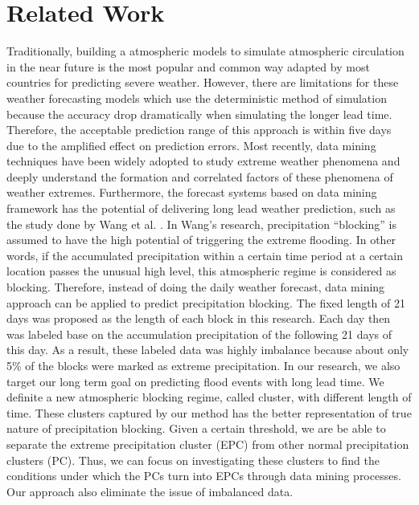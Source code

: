 \documentclass{acm_proc_article-sp}
\begin{document}
\section{Related Work}
\label{sec:relatedwork}
Traditionally, building a atmospheric models to simulate atmospheric circulation in the near future is the most popular and common way adapted by most countries for predicting severe weather.\cite{cloke2009ensemble} However, there are limitations for these weather forecasting models which use the deterministic method of simulation because the accuracy drop dramatically when simulating the longer lead time.\cite{lubchenco2012extreme}
Therefore, the acceptable prediction range of this approach is within five days due to the amplified effect on prediction errors.\cite{alfieri2012operational}
\newline Most recently, data mining techniques have been widely adopted to
study extreme weather phenomena and deeply understand the formation and
correlated factors of these phenomena of weather extremes.
\cite{li2008real} \cite{supinie2009spatiotemporal} \cite{mcgovern2011using}
 \cite{Wang:2013:TLF:2487575.2488220} Furthermore, the forecast systems based on
data mining framework has the potential of delivering long lead weather
prediction, such as the study done by Wang et al.
\cite{Wang:2013:TLF:2487575.2488220}. In Wang's research, precipitation
``blocking'' is assumed to have the high
potential of triggering the extreme flooding. In other words, if
the accumulated precipitation within a certain time period at a certain location
passes the unusual high level, this atmospheric regime is considered as
blocking. Therefore, instead of doing the daily weather forecast, data mining
approach can be applied to predict precipitation blocking. The fixed
length of 21 days was proposed as the length of each block in this research. Each day then was labeled base on the accumulation precipitation of the following 21 days of this day.
As a result, these labeled data was highly imbalance because about only 5\% of the blocks were marked as extreme precipitation.   
\newline In our research, we also target our long term goal on predicting flood
events with long lead time. We definite a new atmospheric blocking
regime, called cluster, with different length of time. These clusters captured by our method has the better representation of true nature of precipitation blocking. Given a certain threshold, we are be able to separate the extreme precipitation cluster (EPC) from other normal precipitation clusters (PC). Thus, we can focus on investigating these clusters to find the conditions under which the PCs turn into EPCs through data mining processes. Our approach also eliminate the issue of imbalanced data.
\end{document}
